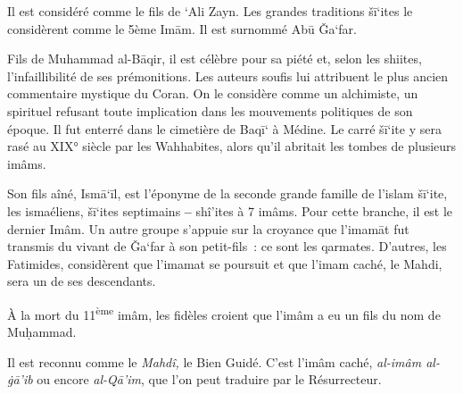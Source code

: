 
Il est considéré comme le fils de `Ali Zayn. Les grandes traditions
šī`ites le considèrent comme le 5ème Imām. Il est surnommé Abū Ǧa`far.


Fils de Muhammad al-Bāqir, il est célèbre pour sa piété et, selon les
shiites, l'infaillibilité de ses prémonitions. Les auteurs soufis lui
attribuent le plus ancien commentaire mystique du Coran. On le considère
comme un alchimiste, un spirituel refusant toute implication dans les
mouvements politiques de son époque. Il fut enterré dans le cimetière de
Baqī` à Médine. Le carré šī`ite y sera rasé au XIX° siècle par les
Wahhabites, alors qu'il abritait les tombes de plusieurs imâms.

Son fils aîné, Ismā`īl, est l'éponyme de la seconde grande famille de
l'islam šī`ite, les ismaéliens, šī`ites septimains \textbf{--} shî'ites
à 7 imâms. Pour cette branche, il est le dernier Imâm. Un autre groupe
s'appuie sur la croyance que l'imamāt fut transmis du vivant de Ǧa`far à
son petit-fils~: ce sont les qarmates. D'autres, les Fatimides,
considèrent que l'imamat se poursuit et que l'imam caché, le Mahdi, sera
un de ses descendants.


À la mort du 11\textsuperscript{ème} imâm, les fidèles croient que
l'imâm a eu un fils du nom de Muḥammad. 
\begin{Def}[Mahdî]
Il est reconnu comme le
\emph{Mahdî,} le Bien Guidé. C'est l'imâm caché, \emph{al-imâm al-ġā'ib}
ou encore \emph{al-Qā'im}, que l'on peut traduire par le Résurrecteur.
\end{Def}


